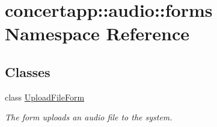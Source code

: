 \hypertarget{namespaceconcertapp_1_1audio_1_1forms}{
\section{concertapp::audio::forms Namespace Reference}
\label{namespaceconcertapp_1_1audio_1_1forms}
}
\subsection*{Classes}
\begin{DoxyCompactItemize}
\item 
class \hyperlink{classconcertapp_1_1audio_1_1forms_1_1_upload_file_form}{UploadFileForm}
\begin{DoxyCompactList}\small\item\em The form uploads an audio file to the system. \item\end{DoxyCompactList}\end{DoxyCompactItemize}
